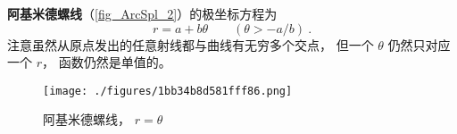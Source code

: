 
\begin{issues}
\issueNeedCite
\issueDraft
\end{issues}


\textbf{阿基米德螺线}（\autoref{fig_ArcSpl_2}）的极坐标方程为
\begin{equation}
r = a + b\theta \qquad (\theta > -a/b)~.
\end{equation}
注意虽然从原点发出的任意射线都与曲线有无穷多个交点， 但一个 $\theta$ 仍然只对应一个 $r$， 函数仍然是单值的。

\begin{figure}[ht]
\centering
\texttt{[image: ./figures/1bb34b8d581fff86.png]}
\caption{阿基米德螺线， $r = \theta$} \label{fig_ArcSpl_2}
\end{figure}
